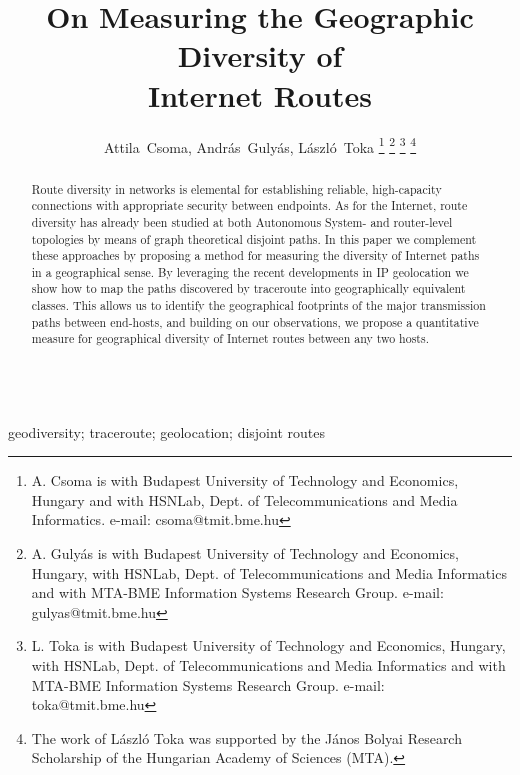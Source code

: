 \documentclass[peerreview]{IEEEtran}
\begin{document}
\title{On Measuring the Geographic Diversity of \\ Internet Routes}



\author{
  Attila~Csoma,
  Andr\'as~Guly\'as,
  L\'aszl\'o~Toka
  \thanks{A. Csoma is with Budapest University of Technology and Economics, Hungary and with HSNLab, Dept. of Telecommunications and Media Informatics. e-mail: csoma@tmit.bme.hu}
  \thanks{A. Guly\'as is with  Budapest University of Technology and Economics, Hungary, with HSNLab, Dept. of Telecommunications and Media Informatics and with MTA-BME Information Systems Research Group. e-mail: gulyas@tmit.bme.hu}
  \thanks{L. Toka is with  Budapest University of Technology and Economics, Hungary, with HSNLab, Dept. of Telecommunications and Media Informatics and with MTA-BME Information Systems Research Group. e-mail: toka@tmit.bme.hu}
  \thanks{The work of L\'aszl\'o Toka was supported by the J\'anos Bolyai Research Scholarship of the Hungarian Academy of Sciences (MTA).}
  }


\maketitle

\begin{abstract}

  Route diversity in networks is elemental for establishing reliable,
  high-capacity connections with appropriate security between endpoints. As for
  the Internet, route diversity has already been studied at both Autonomous
  System- and router-level topologies by means of graph theoretical disjoint
  paths. In this paper we complement these approaches by proposing a method for
  measuring the diversity of Internet paths in a geographical sense. By
  leveraging the recent developments in IP geolocation we show how to map the
  paths discovered by traceroute into geographically equivalent classes. This
  allows us to identify the geographical footprints of the major transmission
  paths between end-hosts, and building on our observations, we propose a
  quantitative measure for geographical diversity of Internet routes between any
  two hosts.
  
\end{abstract}

\begin{IEEEkeywords}
\\geodiversity; traceroute; geolocation; disjoint routes
\end{IEEEkeywords}
\end{document}
